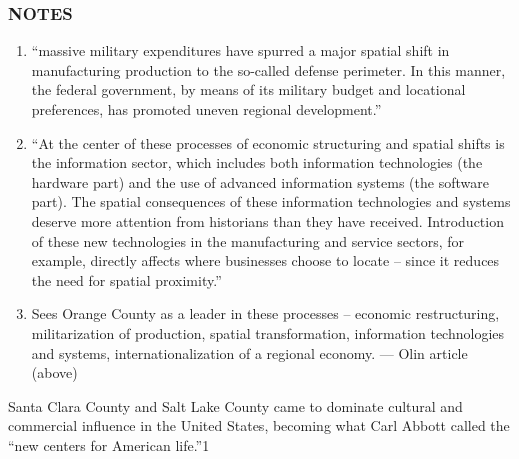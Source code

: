 \documentclass[11pt,article,oneside]{memoir}
\begin{document}
\subsubsection{NOTES}

\begin{enumerate}
\def\labelenumi{(\arabic{enumi})}
\setcounter{enumi}{146}
\item
  ``massive military expenditures have spurred a major spatial shift in
  manufacturing production to the so-called defense perimeter. In this
  manner, the federal government, by means of its military budget and
  locational preferences, has promoted uneven regional development.''
\item
  ``At the center of these processes of economic structuring and spatial
  shifts is the information sector, which includes both information
  technologies (the hardware part) and the use of advanced information
  systems (the software part). The spatial consequences of these
  information technologies and systems deserve more attention from
  historians than they have received. Introduction of these new
  technologies in the manufacturing and service sectors, for example,
  directly affects where businesses choose to locate -- since it reduces
  the need for spatial proximity.''
\item
  Sees Orange County as a leader in these processes -- economic
  restructuring, militarization of production, spatial transformation,
  information technologies and systems, internationalization of a
  regional economy. --- Olin article (above)
\end{enumerate}

Santa Clara County and Salt Lake County came to dominate cultural and
commercial influence in the United States, becoming what Carl Abbott
called the ``new centers for American life.''⁠1
\end{document}
